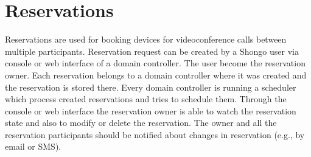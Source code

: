 \chapter{Reservations}

Reservations are used for booking devices for videoconference calls between multiple participants. Reservation request can be created by a Shongo user via console or web interface of a domain controller. The user become the reservation owner. Each reservation belongs to a domain controller where it was created and the reservation is stored there. Every domain controller is running a scheduler which process created reservations and tries to schedule them. Through the console or web interface the reservation owner is able to watch the reservation state and also to modify or delete the reservation. The owner and all the reservation participants should be notified about changes in reservation (e.g., by email or SMS). 

